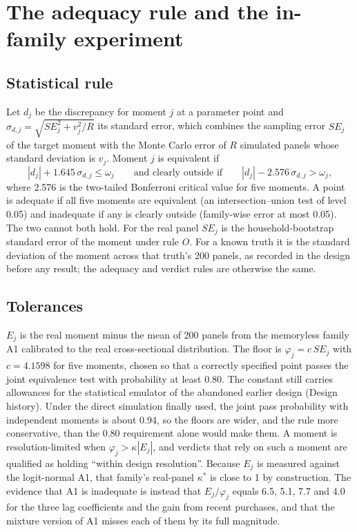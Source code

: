 \documentclass[11pt]{article}
\begin{document}
\section{The adequacy rule and the in-family experiment}
\label{app:adequacy}
\setcounter{table}{0}

\subsection{Statistical rule}
Let $d_j$ be the discrepancy for moment $j$ at a parameter point and
$\sigma_{d,j}=\sqrt{SE_j^2+v_j^2/R}$ its standard error, which combines the sampling error $SE_j$ of
the target moment with the Monte Carlo error of $R$ simulated panels whose standard deviation is
$v_j$. Moment $j$ is equivalent if
\[
|d_j|+1.645\,\sigma_{d,j}\le\omega_j
\qquad\text{and clearly outside if}\qquad
|d_j|-2.576\,\sigma_{d,j}>\omega_j,
\]
where 2.576 is the two-tailed Bonferroni critical value for five moments. A point is adequate if all
five moments are equivalent (an intersection--union test of level 0.05) and inadequate if any is
clearly outside (family-wise error at most 0.05). The two cannot both hold. For the real panel
$SE_j$ is the household-bootstrap standard error of the moment under rule $O$. For a known truth
it is the standard deviation of the moment across that truth's 200 panels, as recorded in the
design before any result; the adequacy and verdict rules are otherwise the same.

\subsection{Tolerances}
$E_j$ is the real moment minus the mean of 200 panels from the memoryless
family A1 calibrated to the real cross-sectional distribution. The floor is $\varphi_j=c\,SE_j$ with
$c=4.1598$ for five moments, chosen so that a correctly specified point passes the joint equivalence
test with probability at least 0.80. The constant still carries allowances for the statistical
emulator of the abandoned earlier design (Design history). Under the direct simulation finally
used, the joint pass probability with independent moments is about 0.94, so the floors are wider,
and the rule more conservative, than the 0.80 requirement alone would make them. A moment is resolution-limited when $\varphi_j>\kappa|E_j|$, and
verdicts that rely on such a moment are qualified as holding ``within design resolution''. Because $E_j$
is measured against the logit-normal A1, that family's real-panel $\kappa^*$ is close to 1 by
construction. The evidence that A1 is inadequate is instead that $E_j/\varphi_j$ equals 6.5, 5.1, 7.7 and
4.0 for the three lag coefficients and the gain from recent purchases, and that the mixture version of A1 misses each of them by its full magnitude.
\end{document}
